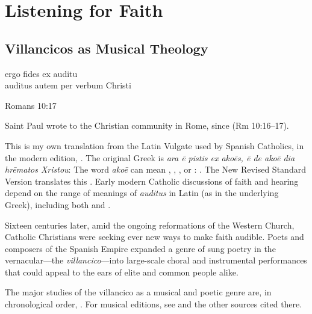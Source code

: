 % 

\part{Listening for Faith}
\label{part:faith}

\chapter{Villancicos as Musical Theology}
\label{ch:intro}

\epigraph
{ergo fides ex auditu\\
auditus autem per verbum Christi}
{Romans 10:17}


Saint Paul wrote to the Christian community in Rome,  since  (Rm 10:16--17).%
\begin{Footnote}
    This is my own translation from the Latin Vulgate used by Spanish Catholics, in
    the modern edition, \autocite{Weber:Vulgate}.
    The original Greek is \emph{ara ē pistis ex akoēs, ē de akoē dia hrēmatos
    Xristou}: \autocite{Aland:GNT4}
    The word \emph{akoē} can mean , , , or : \autocite{BDAG}.
    The New Revised Standard Version translates this .
    Early modern Catholic discussions of faith and hearing depend on the range of
    meanings of \emph{auditus} in Latin (as in the underlying Greek), including both
     and .
\end{Footnote}
Sixteen centuries later, amid the ongoing reformations of the Western Church,
Catholic Christians were seeking ever new ways to make faith audible. 
Poets and composers of the Spanish Empire expanded a genre of sung poetry in the
vernacular---the \emph{villancico}---into large-scale choral and instrumental
performances that could appeal to the ears of elite and common people alike.%
\begin{Footnote}
    The major studies of the villancico as a musical and poetic genre are, in
    chronological order,
    \autocites{Rubio:Forma}{Laird:VC}{Torrente:PhD}{Tenorio:SorJuana}
    {CaberoPueyo:PhD}{Illari:Polychoral}{Knighton-Torrente:VCs}
    {Davies:Guadalupe}
    {Cashner:Cards}{Cashner:PhD}
    {LopezLorenzo:VC-Sevillano}{Swadley:VillancicoPhD}{Torrente:Historia17C}
    {ChavezBarcenas:PhD}.
    For musical editions, see \autocite{Cashner:WLSCM32} and the other sources
    cited there.
\end{Footnote}

